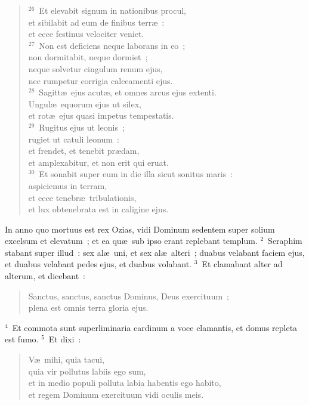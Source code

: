 \begin{flushleft}
\begin{verse}
${}^{26}$~Et elevabit signum in nationibus procul,\\ et sibilabit ad eum de finibus terr\ae~:\\ et ecce festinus velociter veniet.\\
${}^{27}$~Non est deficiens neque laborans in eo~;\\ non dormitabit, neque dormiet~;\\ neque solvetur cingulum renum ejus,\\ nec rumpetur corrigia calceamenti ejus.\\
${}^{28}$~Sagitt\ae\ ejus acut\ae , et omnes arcus ejus extenti.\\ Ungul\ae\ equorum ejus ut silex,\\ et rot\ae\ ejus quasi impetus tempestatis.\\
${}^{29}$~Rugitus ejus ut leonis~;\\ rugiet ut catuli leonum~:\\ et frendet, et tenebit pr\ae dam,\\ et amplexabitur, et non erit qui eruat.\\
${}^{30}$~Et sonabit super eum in die illa sicut sonitus maris~:\\ aspiciemus in terram,\\ et ecce tenebr\ae\ tribulationis,\\ et lux obtenebrata est in caligine ejus.\end{verse}\end{flushleft}



\lettrine[lines=3,image=true,loversize=0.05,lraise=-0.03]{I}{}n anno quo mortuus est rex Ozias, vidi Dominum sedentem super solium excelsum et elevatum~; et ea qu\ae\ sub ipso erant replebant templum.
${}^{2}$~Seraphim stabant super illud~: sex al\ae\ uni, et sex al\ae\ alteri~; duabus velabant faciem ejus, et duabus velabant pedes ejus, et duabus volabant.
${}^{3}$~Et clamabant alter ad alterum, et dicebant~: \begin{flushleft}\begin{verse}Sanctus, sanctus, sanctus Dominus, Deus exercituum~;\\ plena est omnis terra gloria ejus.\end{verse}\end{flushleft}


${}^{4}$~Et commota sunt superliminaria cardinum a voce clamantis, et domus repleta est fumo.
${}^{5}$~Et dixi~: \begin{flushleft}\begin{verse}V\ae\ mihi, quia tacui,\\ quia vir pollutus labiis ego sum,\\ et in medio populi polluta labia habentis ego habito,\\ et regem Dominum exercituum vidi oculis meis.\end{verse}\end{flushleft}


